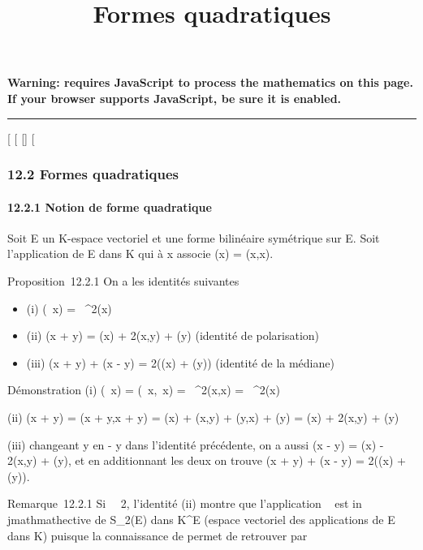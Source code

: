 \documentclass[]{article}
\title{Formes quadratiques}
\author{}
\date{}
\begin{document}
\maketitle

\textbf{Warning: 
requires JavaScript to process the mathematics on this page.\\ If your
browser supports JavaScript, be sure it is enabled.}

\begin{center}\rule{3in}{0.4pt}\end{center}

{[}
{[}
{[}{]}
{[}

\subsubsection{12.2 Formes quadratiques}

\paragraph{12.2.1 Notion de forme quadratique}

Soit E un K-espace vectoriel et \phi une forme bilinéaire symétrique sur E.
Soit \Phi l'application de E dans K qui à x associe \Phi(x) = \phi(x,x).

Proposition~12.2.1 On a les identités suivantes

\begin{itemize}
\itemsep1pt\parskip0pt
\item
  (i) \Phi(\lambda~x) = \lambda~^2\Phi(x)
\item
  (ii) \Phi(x + y) = \Phi(x) + 2\phi(x,y) + \Phi(y) (identité de polarisation)
\item
  (iii) \Phi(x + y) + \Phi(x - y) = 2(\Phi(x) + \Phi(y)) (identité de la médiane)
\end{itemize}

Démonstration (i) \Phi(\lambda~x) = \phi(\lambda~x,\lambda~x) = \lambda~^2\phi(x,x) =
\lambda~^2\Phi(x)

(ii) \Phi(x + y) = \phi(x + y,x + y) = \Phi(x) + \phi(x,y) + \phi(y,x) + \Phi(y) = \Phi(x) +
2\phi(x,y) + \Phi(y)

(iii) changeant y en - y dans l'identité précédente, on a aussi \Phi(x - y)
= \Phi(x) - 2\phi(x,y) + \Phi(y), et en additionnant les deux on trouve \Phi(x + y)
+ \Phi(x - y) = 2(\Phi(x) + \Phi(y)).

Remarque~12.2.1 Si
\mathrmcarK\mathrel\neq~~2,
l'identité (ii) montre que l'application \phi\mapsto~\Phi
est in\\jmathmathective de S_2(E) dans K^E (espace vectoriel
des applications de E dans K) puisque la connaissance de \Phi permet de
retrouver \phi par
\end{document}
